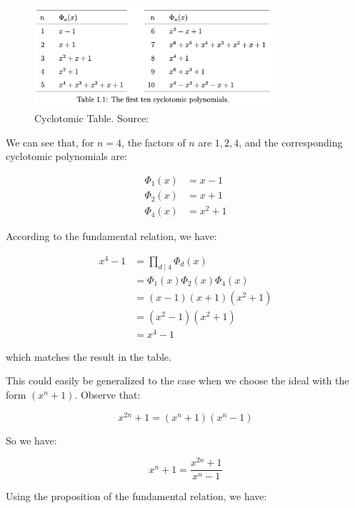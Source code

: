\documentclass[12pt]{article}
\begin{document}
\begin{figure}[h]
    \centering
    \includegraphics[width=0.8\textwidth]{Final_img/cyclotomic_table.png}
    \caption{Cyclotomic Table. Source: \cite[p.~11]{cyclotomic}}
    \label{fig:cyclotomic_table}
\end{figure}

We can see that, for $n = 4$, 
the factors of $n$ are $1, 2, 4$, 
and the corresponding cyclotomic polynomials are:

\begin{align*}
    \Phi_1(x) &= x - 1 \\
    \Phi_2(x) &= x + 1 \\
    \Phi_4(x) &= x^2 + 1
\end{align*}

According to the fundamental relation, we have:

\begin{align*}
    x^4 - 1 
    &= \prod_{d \mid 4} \Phi_d(x) \\
    &= \Phi_1(x) \Phi_2(x) \Phi_4(x) \\
    &= (x - 1)(x + 1)(x^2 + 1) \\
    &= (x^2 - 1)(x^2 + 1) \\
    &= x^4 - 1
\end{align*}

which matches the result in the table.

This could easily be generalized to the case when we choose the ideal with the form $(x^n + 1)$.
Observe that:

\begin{equation*}
    x^{2n} + 1 = (x^n + 1)(x^n - 1)
\end{equation*}

So we have:

\begin{equation*}
    x^n + 1 = \frac{x^{2n} + 1}{x^n - 1}
\end{equation*}

Using the proposition of the fundamental relation, we have:
\end{document}
